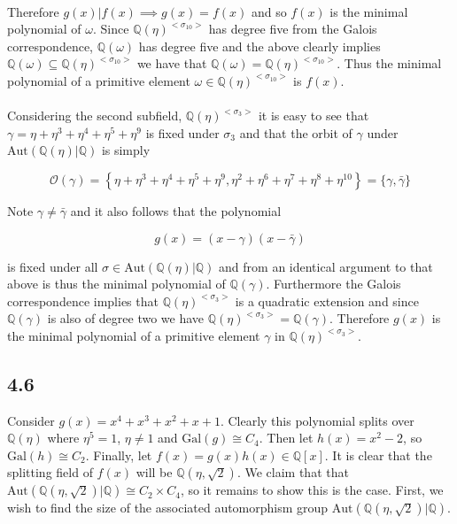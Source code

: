 \documentclass{article}
\begin{document}
\paragraph{}
Therefore 
$g(x)|f(x) \implies g(x) = f(x)$ and so $f(x)$ is the minimal polynomial of $\omega$. Since 
$\mathbb{Q}(\eta)^{<\sigma_{10}>}$ has degree five from the Galois correspondence, $\mathbb{Q}(\omega)$ 
has degree five and the above clearly implies $\mathbb{Q}(\omega) \subseteq \mathbb{Q}(\eta)^{<\sigma_{10}>}$ 
we have that $\mathbb{Q}(\omega) = \mathbb{Q}(\eta)^{<\sigma_{10}>}$. Thus the minimal polynomial of a 
primitive element $\omega \in \mathbb{Q}(\eta)^{<\sigma_{10}>}$ is $f(x)$.

\paragraph{}
Considering the second subfield, $\mathbb{Q}(\eta)^{<\sigma_3>}$ it is easy to see that 
$\gamma = \eta + \eta^3 + \eta^4 + \eta^5 + \eta^9$ is fixed under $\sigma_3$ and that the orbit 
of $\gamma$ under $\text{Aut}(\mathbb{Q}(\eta)|\mathbb{Q})$ is simply 

\begin{equation*}
    \mathcal{O}(\gamma) = \left\{\eta + \eta^3 + \eta^4 + \eta^5 + \eta^9,\eta^2 + \eta^6 + \eta^7 + \eta^8 + \eta^{10}\right\} = \{\gamma,\bar{\gamma}\}
\end{equation*}

Note $\gamma \neq \bar{\gamma}$ and it also follows that the polynomial 

\begin{equation*}
    g(x) = (x-\gamma)(x-\bar{\gamma})
\end{equation*}

is fixed under all $\sigma \in \text{Aut}(\mathbb{Q}(\eta)|\mathbb{Q})$ and from an identical argument 
to that above is thus the minimal polynomial of $\mathbb{Q}(\gamma)$. Furthermore the Galois correspondence 
implies that $\mathbb{Q}(\eta)^{<\sigma_3>}$ is a quadratic extension and since $\mathbb{Q}(\gamma)$ is 
also of degree two we have $\mathbb{Q}(\eta)^{<\sigma_3>} = \mathbb{Q}(\gamma)$. Therefore $g(x)$ 
is the minimal polynomial of a primitive element $\gamma$ in $\mathbb{Q}(\eta)^{<\sigma_3>}$.

\subsection*{4.6}
Consider $g(x) = x^4+x^3+x^2+x+1$. Clearly this polynomial splits over $\mathbb{Q}(\eta)$ where 
$\eta^5 =1$, $\eta \neq 1$ and $\text{Gal}(g) \cong C_4$. Then let $h(x) = x^2 -2$, so 
$\text{Gal}(h) \cong C_2$. Finally, let $f(x) = g(x)h(x) \in \mathbb{Q}[x]$. It is clear that 
the splitting field of $f(x)$ will be $\mathbb{Q}(\eta,\sqrt{2})$. We claim that 
that $\text{Aut}(\mathbb{Q}(\eta,\sqrt{2})|\mathbb{Q}) \cong C_2 \times C_4$, so it remains to show this is the case. 
First, we wish to find the size of 
the associated automorphism group $\text{Aut}(\mathbb{Q}(\eta,\sqrt{2})|\mathbb{Q})$.
\end{document}
